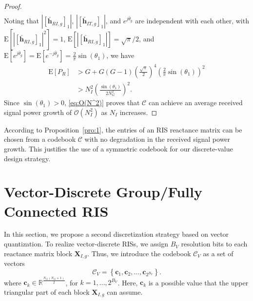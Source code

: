 \documentclass[twocolumn,10pt]{IEEEtran}
\begin{document}
\begin{proof}
\begin{multline}
\end{multline}
Noting that $\left|[\bar{\mathbf{h}}_{RI,g}]_1\right|$, $\left|[\bar{\mathbf{h}}_{IT,g}]_1\right|$, and $e^{j\bar{\theta}_g}$ are independent with each other, with $\text{E}\left[\left|[\bar{\mathbf{h}}_{RI,g}]_1\right|^2\right]=1$, $\text{E}\left[\left|[\bar{\mathbf{h}}_{RI,g}]_1\right|\right]=\sqrt{\pi}/2$, and $\text{E}\left[e^{j\bar{\theta}_g}\right]=\text{E}\left[e^{-j\bar{\theta}_g}\right]=\frac{2}{\pi}\sin\left(\theta_1\right)$, we have
\begin{align}
\text{E}\left[P_{R}\right]
& >G+G\left(G-1\right)\left(\frac{\sqrt{\pi}}{2}\right)^4\left(\frac{2}{\pi}\sin\left(\theta_1\right)\right)^2\\
& >N_I^2\left(\frac{\sin\left(\theta_1\right)}{2N_G^2}\right)^2.\label{eq:O(N^2)}
\end{align}
Since $\sin\left(\theta_1\right)>0$, \eqref{eq:O(N^2)} proves that $\mathcal{C}$ can achieve an average received signal power growth of $\mathcal{O}\left(N_I^2\right)$ as $N_I$ increases.
\end{proof}

According to Proposition~\ref{pro:1}, the entries of an RIS reactance matrix can be chosen from a codebook $\mathcal{C}$ with no degradation in the received signal power growth.
This justifies the use of a symmetric codebook for our discrete-value design strategy.

\section{Vector-Discrete Group/Fully Connected RIS}
\label{sec:vector-discrete}

In this section, we propose a second discretization strategy based on vector quantization.
To realize vector-discrete RISs, we assign $B_V$ resolution bits to each reactance matrix block $\mathbf{X}_{I,g}$.
Thus, we introduce the codebook $\mathcal{C}_V$ as a set of vectors
\begin{equation}
\mathcal{C}_{V} = \left\{\mathbf{c}_{1},\mathbf{c}_{2},\ldots,\mathbf{c}_{2^{B_V}}\right\}.
\end{equation}
where $\mathbf{c}_{k}\in\mathbb{R}^{\frac{N_{G}\left(N_{G}+1\right)}{2}}$, for $k=1,\ldots,2^{B_V}$.
Here, $\mathbf{c}_{k}$ is a possible value that the upper triangular part of each block $\mathbf{X}_{I,g}$ can assume.
\end{document}
